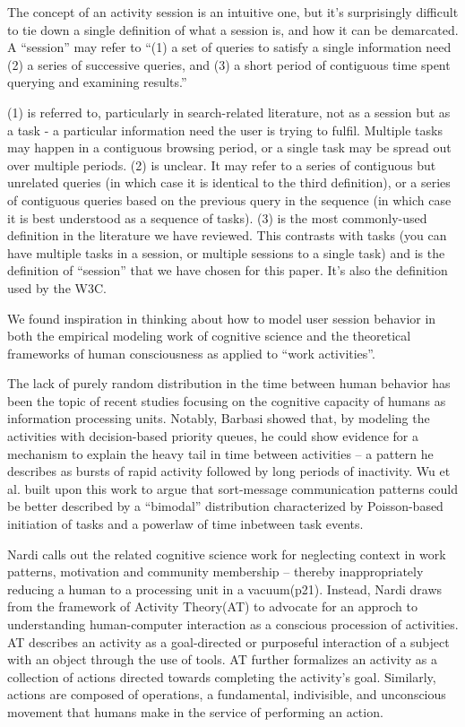 The concept of an activity session is an intuitive one, but it's surprisingly difficult to tie down a single definition of what a session is, and how it can be demarcated.  A ``session'' may refer to ``(1) a set of queries to satisfy a single information need (2) a series of successive queries, and (3) a short period of contiguous time spent querying and examining results.''\cite{jones2008beyond}

(1) is referred to, particularly in search-related literature,\cite{jones2008beyond, eickhoff2014lessons} not as a session but as a task - a particular information need the user is trying to fulfil.  Multiple tasks may happen in a contiguous browsing period, or a single task may be spread out over multiple periods.
(2) is unclear. It may refer to a series of contiguous but unrelated queries (in which case it is identical to the third definition), or a series of contiguous queries based on the previous query in the sequence (in which case it is best understood as a sequence of tasks).
(3) is the most commonly-used definition in the literature we have reviewed\cite{spiliopoulou2003framework,white2010assessing,govseva2006empirical,nadjarbashi2004improving}. This contrasts with tasks (you can have multiple tasks in a session, or multiple sessions to a single task) and is the definition of ``session'' that we have chosen for this paper. It's also the definition used by the W3C.\cite{W3C1999}

We found inspiration in thinking about how to model user session behavior in both the empirical modeling work of cognitive science and the theoretical frameworks of human consciousness as applied to ``work activities''.
 
The lack of purely random distribution in the time between human behavior has been the topic of recent studies focusing on the cognitive capacity of humans as information processing units.  Notably, Barbasi showed that, by modeling the activities with decision-based priority queues, he could show evidence for a mechanism to explain the heavy tail in time between activities\cite{barabasi2005origin} -- a pattern he describes as bursts of rapid activity followed by long periods of inactivity.  Wu et al. built upon this work to argue that sort-message communication patterns could be better described by a ``bimodal'' distribution characterized by Poisson-based initiation of tasks and a powerlaw of time inbetween task events\cite{wu2010evidence}.

Nardi calls out the related cognitive science work for neglecting context in work patterns, motivation and community membership -- thereby inappropriately reducing a human to a processing unit in a vacuum\cite{nardi1996context}(p21).  Instead, Nardi draws from the framework of Activity Theory(AT) to advocate for an approch to understanding human-computer interaction as a conscious procession of activities.  AT describes an activity as a goal-directed or purposeful interaction of a subject with an object through the use of tools. AT further formalizes an activity as a collection of actions directed towards completing the activity's goal.  Similarly, actions are composed of operations, a fundamental, indivisible, and unconscious movement that humans make in the service of performing an action.

